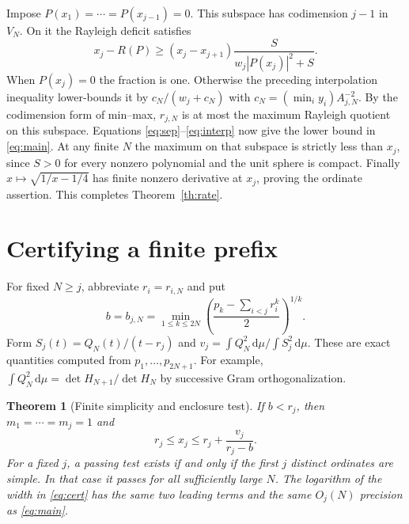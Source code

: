 \documentclass[11pt]{article}
\newtheorem{theorem}{Theorem}
\newcommand{\dd}{\,\mathrm d}
\begin{document}
Impose $P(x_1)=\cdots=P(x_{j-1})=0$. This subspace has codimension $j-1$ in $V_N$. On it the Rayleigh deficit satisfies
\[
 x_j-R(P)\ge (x_j-x_{j+1})\frac{S}{w_j|P(x_j)|^2+S}.
\]
When $P(x_j)=0$ the fraction is one. Otherwise the preceding interpolation inequality lower-bounds it by $c_N/(w_j+c_N)$ with $c_N=(\min_i y_i)A_{j,N}^{-2}$. By the codimension form of min--max, $r_{j,N}$ is at most the maximum Rayleigh quotient on this subspace. Equations \eqref{eq:sep}--\eqref{eq:interp} now give the lower bound in \eqref{eq:main}. At any finite $N$ the maximum on that subspace is strictly less than $x_j$, since $S>0$ for every nonzero polynomial and the unit sphere is compact. Finally $x\mapsto\sqrt{1/x-1/4}$ has finite nonzero derivative at $x_j$, proving the ordinate assertion. This completes Theorem~\ref{th:rate}.

\section{Certifying a finite prefix}
For fixed $N\ge j$, abbreviate $r_i=r_{i,N}$ and put
\begin{equation}
 b=b_{j,N}=\min_{1\le k\le 2N}
 \left(\frac{p_k-\sum_{i<j}r_i^k}{2}\right)^{1/k}.
 \label{eq:sep-test}
\end{equation}
Form $S_j(t)=Q_N(t)/(t-r_j)$ and $v_j=\int Q_N^2\dd\mu/\int S_j^2\dd\mu$. These are exact quantities computed from $p_1,\ldots,p_{2N+1}$. For example, $\int Q_N^2\dd\mu=\det H_{N+1}/\det H_N$ by successive Gram orthogonalization.
\begin{theorem}[Finite simplicity and enclosure test]\label{th:cert}
If $b<r_j$, then $m_1=\cdots=m_j=1$ and
\begin{equation}
 r_j\le x_j\le r_j+\frac{v_j}{r_j-b}.
 \label{eq:cert}
\end{equation}
For a fixed $j$, a passing test exists if and only if the first $j$ distinct ordinates are simple. In that case it passes for all sufficiently large $N$. The logarithm of the width in \eqref{eq:cert} has the same two leading terms and the same $O_j(N)$ precision as \eqref{eq:main}.
\end{theorem}
\end{document}
